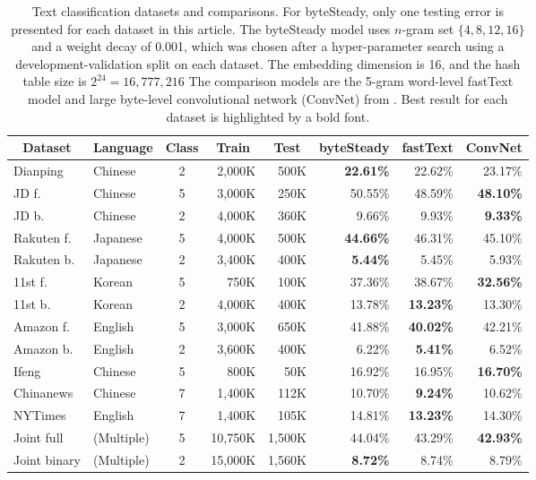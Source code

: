 \documentclass[sigconf,review, anonymous]{acmart}
\begin{document}
\begin{table}[t]
  \caption{Text classification datasets and comparisons. For byteSteady, only one testing error is presented for each dataset in this article. The byteSteady model uses \(n\)-gram set \(\{4,8,12,16\}\) and a weight decay of 0.001, which was chosen after a hyper-parameter search using a development-validation split on each dataset. The embedding dimension is 16, and the hash table size is \(2^{24}=16,777,216\) The comparison models are the 5-gram word-level fastText model and large byte-level convolutional network (ConvNet) from \cite{ZL17}. Best result for each dataset is highlighted by a bold font.}
  \label{tab:text}
  \begin{center}
    \begin{tabular}{llcrrrrr}
      \hline
      \multicolumn{1}{c}{\textbf{Dataset}}  & \multicolumn{1}{c}{\textbf{Language}}  & \multicolumn{1}{c}{\textbf{Class}} & \multicolumn{1}{c}{\textbf{Train}} & \multicolumn{1}{c}{\textbf{Test}}& \multicolumn{1}{c}{\textbf{byteSteady}}& \multicolumn{1}{c}{\textbf{fastText}}& \multicolumn{1}{c}{\textbf{ConvNet}} \\ \hline
      Dianping & Chinese & 2 & 2,000K & 500K & \textbf{22.61\%} & 22.62\% & 23.17\% \\
      JD f. & Chinese & 5 & 3,000K & 250K & 50.55\% & 48.59\% & \textbf{48.10\%} \\
      JD b. & Chinese & 2 & 4,000K & 360K & 9.66\% & 9.93\% & \textbf{9.33\%} \\
      Rakuten f. & Japanese & 5 & 4,000K & 500K & \textbf{44.66\%} & 46.31\% & 45.10\% \\
      Rakuten b. & Japanese & 2 & 3,400K & 400K & \textbf{5.44\%} & 5.45\% & 5.93\% \\
      11st f. & Korean & 5 & 750K & 100K & 37.36\% & 38.67\% & \textbf{32.56\%} \\
      11st b. & Korean & 2 & 4,000K & 400K & 13.78\% & \textbf{13.23\%} & 13.30\% \\
      Amazon f. & English & 5 & 3,000K & 650K & 41.88\% & \textbf{40.02\%} & 42.21\% \\
      Amazon b. & English & 2 & 3,600K & 400K & 6.22\% & \textbf{5.41\%} & 6.52\% \\
      Ifeng & Chinese & 5 & 800K & 50K & 16.92\% & 16.95\% & \textbf{16.70\%} \\
      Chinanews & Chinese & 7 & 1,400K & 112K & 10.70\% & \textbf{9.24\%} & 10.62\% \\
      NYTimes & English & 7 & 1,400K & 105K & 14.81\% & \textbf{13.23\%} & 14.30\% \\
      Joint full & (Multiple) & 5 & 10,750K & 1,500K & 44.04\% & 43.29\% & \textbf{42.93\%} \\
      Joint binary & (Multiple) & 2 & 15,000K & 1,560K & \textbf{8.72\%} & 8.74\% & 8.79\% \\
      \hline
    \end{tabular}
  \end{center}
\end{table}
\end{document}
